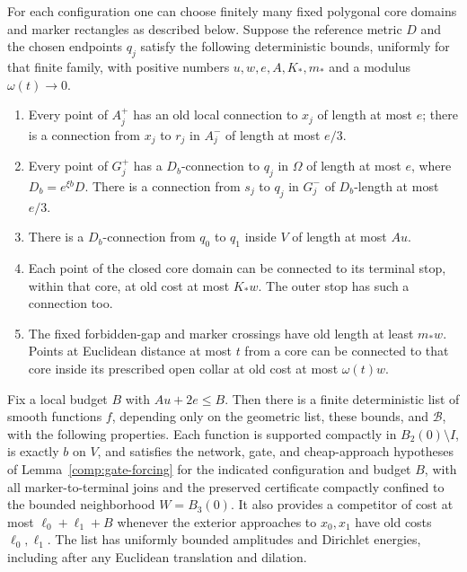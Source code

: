 \begin{lemma}
For each configuration one can choose finitely many fixed
polygonal core domains and marker rectangles as described
below.  Suppose the reference metric $D$ and the chosen
endpoints $q_j$ satisfy the following deterministic bounds,
uniformly for that finite family, with positive numbers
$u,w,e,A,K_*,m_*$ and a modulus $\omega(t)\to0$.
\begin{enumerate}[label=(\roman*)]
\item Every point of $A_j^+$ has an old local connection to
      $x_j$ of length at most $e$; there is a connection from
      $x_j$ to $r_j$ in $A_j^-$ of length at most $e/3$.
\item Every point of $G_j^+$ has a $D_b$-connection to $q_j$
      in $\Omega$ of length at most $e$, where
      $D_b=e^{\xi b}D$.  There is a connection from $s_j$ to
      $q_j$ in $G_j^-$ of $D_b$-length at most $e/3$.
\item There is a $D_b$-connection from $q_0$ to $q_1$ inside
      $V$ of length at most $Au$.
\item Each point of the closed core domain can be connected
      to its terminal stop, within that core, at old cost at
      most $K_*w$.  The outer stop has such a connection too.
\item The fixed forbidden-gap and marker crossings have old
      length at least $m_*w$.  Points at Euclidean distance
      at most $t$ from a core can be connected to that core
      inside its prescribed open collar at old cost at most
      $\omega(t)w$.
\end{enumerate}
Fix a local budget $B$ with $Au+2e\le B$.  Then there is a
finite deterministic list of smooth functions $f$, depending
only on the geometric list, these bounds, and $\mathcal B$,
with the following properties.
Each function is supported compactly in
$B_2(0)\setminus I$, is exactly $b$ on $V$, and satisfies
the network, gate, and cheap-approach hypotheses of
Lemma~\ref{comp:gate-forcing} for the indicated configuration
and budget $B$, with all marker-to-terminal joins and the preserved
certificate compactly confined to the bounded neighborhood
$W=B_3(0)$.  It also provides a competitor of cost at
most $\ell_0+\ell_1+B$ whenever the exterior approaches to
$x_0,x_1$ have old costs $\ell_0,\ell_1$.
The list has uniformly bounded amplitudes and Dirichlet
energies, including after any Euclidean translation and
dilation.
\end{lemma}


